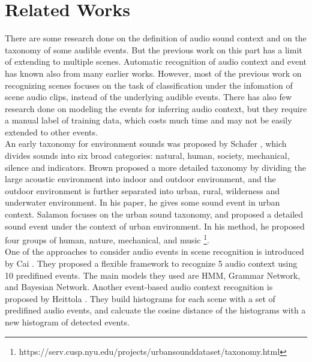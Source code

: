 \chapter{Related Works}
There are some research done on the definition of audio sound context and on the taxonomy of some audible events. 
But the previous work on this part has a limit of extending to multiple scenes. 
Automatic recognition of audio context and event has known also from many earlier works. 
However, most of the previous work on recognizing scenes focuses on the task of classification under the infomation of scene audio clips, instead of the underlying audible events. 
There has also few research done on modeling the events for inferring audio context, but they require a manual label of training data, which costs much time and may not be easily extended to other events. \\ 

An early taxonomy for environment sounds was proposed by Schafer \cite{schafer1993soundscape}, which divides sounds into six broad categories: natural, human, society, mechanical, silence and indicators. 
Brown \cite{brown2011towards} proposed a more detailed taxonomy by dividing the large acoustic environment into indoor and outdoor environment, and the outdoor environment is further separated into urban, rural, wilderness and underwater environment. 
In his paper, he gives some sound event in urban context.
Salamon \cite{salamon2014dataset} focuses on the urban sound taxonomy, and proposed a detailed sound event under the context of urban environment. 
In his method, he proposed four groups of human, nature, mechanical, and music \footnote{https://serv.cusp.nyu.edu/projects/urbansounddataset/taxonomy.html}. \\ 

One of the approaches to consider audio events in scene recognition is introduced by Cai  \cite{cai2006flexible}. 
They proposed a flexible framework to recognize 5 audio context using 10 predifined events. 
The main models they used are HMM, Grammar Network, and Bayesian Network. 
Another event-based audio context recognition is proposed by Heittola \cite{heittola2010audio}. 
They build histograms for each scene with a set of predifined audio events, and calcuate the cosine distance of the histograms with a new histogram of detected events.\\


